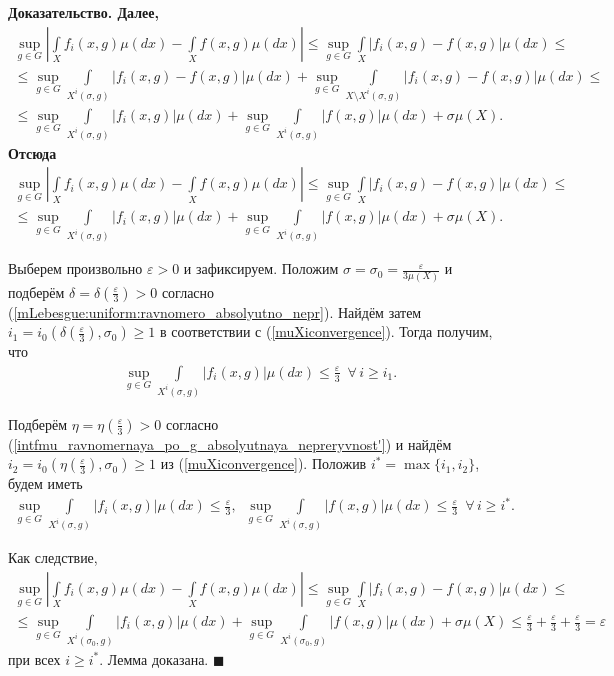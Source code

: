 \documentclass{report}
\newenvironment{Proof}{\par\noindent\bf Доказательство.\rm}{ $\blacksquare$\par}
\begin{document}
\begin{Proof}
Далее,
\begin{gather*}
\sup\limits_{g\in G}\left|\int\limits_Xf_i(x,g)\mu(dx)-\int\limits_Xf(x,g)\mu(dx)\right|\leqslant\sup\limits_{g\in G}\int\limits_X|f_i(x,g)-f(x,g)|\mu(dx)\leqslant\\
\leqslant\sup\limits_{g\in G}\int\limits_{X^i(\sigma,g)}|f_i(x,g)-f(x,g)|\mu(dx)+\sup\limits_{g\in G}\int\limits_{X\setminus X^i(\sigma,g)}|f_i(x,g)-f(x,g)|\mu(dx)\leqslant\\
\leqslant\sup\limits_{g\in G}\int\limits_{X^i(\sigma,g)}|f_i(x,g)|\mu(dx)+\sup\limits_{g\in G}\int\limits_{X^i(\sigma,g)}|f(x,g)|\mu(dx)+\sigma\mu(X).
\end{gather*}
Отсюда
\begin{gather*}
\sup\limits_{g\in G}\left|\int\limits_Xf_i(x,g)\mu(dx)-\int\limits_Xf(x,g)\mu(dx)\right|\leqslant\sup\limits_{g\in G}\int\limits_X|f_i(x,g)-f(x,g)|\mu(dx)\leqslant\\
\leqslant\sup\limits_{g\in G}\int\limits_{X^i(\sigma,g)}|f_i(x,g)|\mu(dx)+\sup\limits_{g\in G}\int\limits_{X^i(\sigma,g)}|f(x,g)|\mu(dx)+\sigma\mu(X).
\end{gather*}

Выберем произвольно $\varepsilon>0$ и зафиксируем. Положим $\sigma=\sigma_0=\frac\varepsilon{3\mu(X)}$ и подберём $\delta=\delta(\frac\varepsilon3)>0$ согласно
(\ref{mLebesgue:uniform:ravnomero_absolyutno_nepr}). Найдём затем $i_1=i_0(\delta(\frac\varepsilon3), \sigma_0)\geqslant1$ в соответствии с (\ref{muXiconvergence}). Тогда получим, что
\begin{gather*}
\sup\limits_{g\in G}\int\limits_{X^i(\sigma,g)}|f_i(x,g)|\mu(dx)\leqslant\frac\varepsilon3\,\,\,\forall\, i\geqslant i_1.
\end{gather*}

Подберём $\eta=\eta(\frac\varepsilon3)>0$ согласно (\ref{intfmu_ravnomernaya_po_g_absolyutnaya_nepreryvnost'}) и найдём $i_2=i_0(\eta(\frac\varepsilon3), \sigma_0)\geqslant1$ из
(\ref{muXiconvergence}). Положив $i^*=\max\{i_1,i_2\}$, будем иметь
\begin{gather*}
\sup\limits_{g\in G}\int\limits_{X^i(\sigma,g)}|f_i(x,g)|\mu(dx)\leqslant\frac\varepsilon3,\,\,\,
\sup\limits_{g\in G}\int\limits_{X^i(\sigma,g)}|f(x,g)|\mu(dx)\leqslant\frac\varepsilon3\,\,\,\forall\,i\geqslant i^*.
\end{gather*}

Как следствие,
\begin{gather*}
\sup\limits_{g\in G}\left|\int\limits_Xf_i(x,g)\mu(dx)-\int\limits_Xf(x,g)\mu(dx)\right|\leqslant\sup\limits_{g\in G}\int\limits_X|f_i(x,g)-f(x,g)|\mu(dx)\leqslant\\
\leqslant\sup\limits_{g\in G}\int\limits_{X^i(\sigma_0,g)}|f_i(x,g)|\mu(dx)+\sup\limits_{g\in G}\int\limits_{X^i(\sigma_0,g)}|f(x,g)|\mu(dx)+\sigma\mu(X)\leqslant\frac\varepsilon3+
\frac\varepsilon3+\frac\varepsilon3=\varepsilon
\end{gather*}
при всех $i\geqslant i^*$. Лемма доказана.
\end{Proof}
\end{document}

